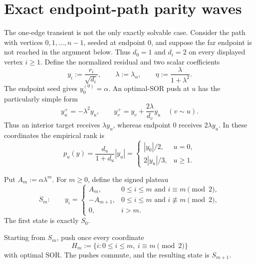 \section{Exact endpoint-path parity waves}
\label{sec:direct-path}

The one-edge transient is not the only exactly solvable case. Consider the
path with vertices $0,1,\ldots,n-1$, seeded at endpoint $0$, and suppose the
far endpoint is not reached in the argument below. Thus $d_0=1$ and
$d_i=2$ on every displayed vertex $i\geq1$. Define the normalized residual
and two scalar coefficients
\begin{equation}
 y_i:=\frac{r_i}{\sqrt{d_i}},
 \qquad
 \lambda:=\lambda_\alpha,
 \qquad
 \eta:=\frac{\lambda}{1+\lambda^2}.
 \label{eq:direct-path-normalization}
\end{equation}
The endpoint seed gives $y^{(0)}_0=\alpha$. An optimal-SOR push at $u$ has
the particularly simple form
\begin{equation}
 y_u^+=-\lambda^2y_u,
 \qquad
 y_v^+=y_v+\frac{2\lambda}{d_v}y_u
 \quad(v\sim u).
 \label{eq:direct-path-sor-update}
\end{equation}
Thus an interior target receives $\lambda y_u$, whereas endpoint $0$
receives $2\lambda y_u$. In these coordinates the empirical rank is
\begin{equation}
 p_u(y)=\frac{d_u}{1+d_u}|y_u|
 =\begin{cases}|y_0|/2,&u=0,\\2|y_u|/3,&u\geq1.
 \end{cases}
 \label{eq:direct-path-rank}
\end{equation}

Put $A_m:=\alpha\lambda^m$. For $m\geq0$, define the signed plateau
\begin{equation}
 S_m:\qquad
 y_i=\begin{cases}
  A_m,&0\leq i\leq m\text{ and }i\equiv m\pmod2,\\
  -A_{m+1},&0\leq i\leq m\text{ and }i\not\equiv m\pmod2,\\
  0,&i>m.
 \end{cases}
 \label{eq:direct-path-plateau}
\end{equation}
The first state is exactly $S_0$.

\begin{lemma}
\label{lem:direct-path-sweep}
Starting from $S_m$, push once every coordinate
\begin{equation*}
 H_m:=\{i:0\leq i\leq m,\ i\equiv m\pmod2\}
\end{equation*}
with optimal SOR. The pushes commute, and the resulting state is $S_{m+1}$.
\end{lemma}

